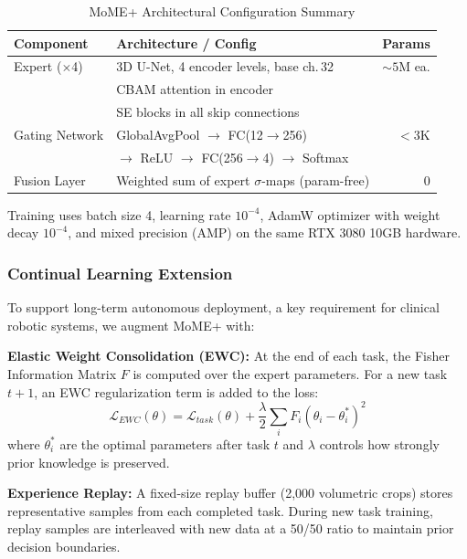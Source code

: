 \documentclass[conference]{IEEEtran}
\begin{document}
\begin{table}[htbp]
\caption{MoME+ Architectural Configuration Summary}
\begin{center}
\begin{tabular}{l l r}
\toprule
\textbf{Component} & \textbf{Architecture / Config} & \textbf{Params} \\
\midrule
Expert ($\times$4)    & 3D U-Net, 4 encoder levels, base ch.\,32  & ${\sim}5$M ea. \\
                      & CBAM attention in encoder                  & \\
                      & SE blocks in all skip connections          & \\
\midrule
Gating Network & GlobalAvgPool $\to$ FC(12${\to}$256)              & $<$3K \\
               & $\to$ ReLU $\to$ FC(256${\to}$4) $\to$ Softmax   & \\
\midrule
Fusion Layer   & Weighted sum of expert $\sigma$-maps (param-free) & 0 \\
\bottomrule
\end{tabular}
\label{tab:arch_config}
\end{center}
\end{table}
Training uses batch size 4, learning rate $10^{-4}$, AdamW optimizer with weight decay $10^{-4}$, and mixed precision (AMP) on the same RTX 3080 10GB hardware.

\subsubsection{Continual Learning Extension}
To support long-term autonomous deployment, a key requirement for clinical robotic systems, we augment MoME+ with:

\textbf{Elastic Weight Consolidation (EWC):} At the end of each task, the Fisher Information Matrix $F$ is computed over the expert parameters. For a new task $t+1$, an EWC regularization term is added to the loss:
\begin{equation}
\mathcal{L}_{EWC}(\theta) = \mathcal{L}_{task}(\theta) + \frac{\lambda}{2} \sum_{i} F_i (\theta_i - \theta_{i}^{*})^2
\end{equation}
where $\theta_i^*$ are the optimal parameters after task $t$ and $\lambda$ controls how strongly prior knowledge is preserved.

\textbf{Experience Replay:} A fixed-size replay buffer (2,000 volumetric crops) stores representative samples from each completed task. During new task training, replay samples are interleaved with new data at a 50/50 ratio to maintain prior decision boundaries.
\end{document}
